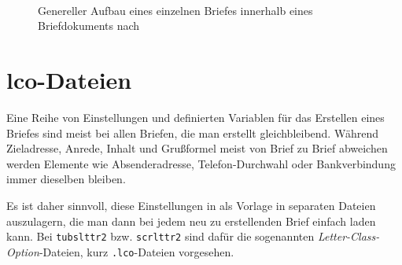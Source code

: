 \begin{figure}[!ht]
  \centering\small
  \\[1pt]
  \\[1pt]
  \\[\dp\strutbox]
  \caption[Genereller Aufbau eines einzelnen Briefes innerhalb eines
    Briefdokuments]{Genereller Aufbau eines einzelnen Briefes
    innerhalb eines Briefdokuments nach \cite[S.171]{koma-skript} }
  \label{fig:scrlttr2.letter}
\end{figure}

\section{lco-Dateien}\label{sec:lco}

Eine Reihe von Einstellungen und definierten Variablen für das Erstellen eines
Briefes sind meist bei allen Briefen, die man erstellt gleichbleibend.
Während Zieladresse, Anrede, Inhalt und Grußformel meist von Brief zu Brief
abweichen werden Elemente wie Absenderadresse, Telefon-Durchwahl oder
Bankverbindung immer dieselben bleiben.

Es ist daher sinnvoll, diese Einstellungen in als Vorlage in separaten Dateien
auszulagern, die man dann bei jedem neu zu erstellenden Brief einfach laden
kann. Bei \texttt{tubslttr2} bzw. \texttt{scrlttr2} sind dafür die sogenannten
\emph{Letter-Class-Option}-Dateien, kurz \texttt{.lco}-Dateien vorgesehen.

